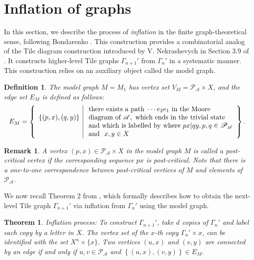 \documentclass{article}
\newtheorem{mythm}{Theorem}[section]
\newtheorem{mydef}{Definition}[section]
\newtheorem{myrem}{Remark}[section]
\newcommand{\A}{\mathcal{A}}
\newcommand{\G}{\Gamma}
\newcommand{\pc}{\mathscr{P}_{\A}}
\begin{document}
\section{Inflation of graphs}\label{sec:inflation}
In this section, we describe the process of \emph{inflation} in the finite graph-theoretical sense, following Bondarenko \cite{bondarenko2007groups}. This construction provides a combinatorial analog of the Tile diagram construction introduced by V. Nekrashevych in Section 3.9 of \cite{nekrashevych2005self}. It constructs higher-level Tile graphs $\G_{n+1}'$ from $\G_n'$ in a systematic manner. This construction relies on an auxiliary object called the model graph.

\begin{mydef} \label{def:model}
	The model graph $M = M_1$ has vertex set $V_M = \pc \times X$, and the edge set $E_M$ is defined as follows: 
\begin{eqnarray}
\label{Equation:model-edges}
E_M = \left\lbrace \begin{array}{l | l}
& \textnormal{ there exists a path } \cdots e_2e_1 \textnormal{ in the Moore }\nonumber\\ 
\{(p,x),(q,y)\} & \textnormal{ diagram of } \A, \textnormal{ which ends in the trivial  state }\\
&  \textnormal{ and which is labelled by where }  px|qy, p,q \in \mathcal{P_A}\\
& \textnormal{ and } ~x,y \in X \end{array} \right\rbrace.
\end{eqnarray}
\end{mydef}
\begin{myrem}
A vertex $(p, x) \in \pc \times X$ in the model graph $M$ is called a post-critical vertex if the corresponding sequence $px$ is post-critical. Note that there is a one-to-one correspondence between post-critical vertices of $M$ and elements of $\pc$.
\end{myrem}

We now recall Theorem 2 from \cite{bondarenko2016ends}, which formally describes how to obtain the next-level Tile graph $\G_{n+1}'$ via inflation from $\G_n'$ using the model graph.

\begin{mythm}
\label{Theorem:bon-inflation} Inflation process: To construct $\G_{n+1}'$, take $d$ copies of $\G_n'$ and label each copy by a letter in $X$. The vertex set of the $x$-th copy $\G_n' \times x$,  can be identified with the set $X^n \times \{x\}.$ Two vertices $(u,x)$ and $(v,y)$ are connected by an edge if and only if $u, v \in \pc$ and $\left\{(u, x), (v, y)\right\} \in E_M.$
\end{mythm}
\end{document}
